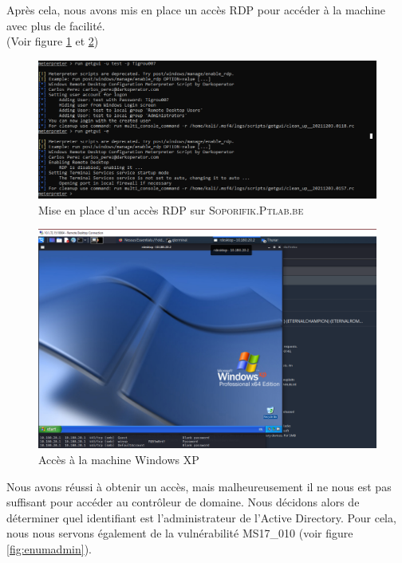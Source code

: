 \documentclass[a4paper]{article}
\begin{document}
Après cela, nous avons mis en place un accès RDP pour accéder à la machine avec plus de facilité.\\ (Voir figure \ref{fig:getgui} et \ref{fig:winxp})

\begin{figure}[H]
    \centering
    \includegraphics[width=1\textwidth]{images/lab4/rdp.PNG}
    \caption{Mise en place d'un accès RDP sur \textsc{Soporifik.Ptlab.be}}
    \label{fig:getgui}
\end{figure}

\begin{figure}[H]
    \centering
    \includegraphics[width=1\textwidth]{images/lab4/winxp_access.png}
    \caption{Accès à la machine Windows XP}
    \label{fig:winxp}
\end{figure}

Nous avons réussi à obtenir un accès, mais malheureusement il ne nous est pas suffisant pour accéder au contrôleur de domaine. Nous décidons alors de déterminer quel identifiant est l'administrateur de l'Active Directory. Pour cela, nous nous servons également de la vulnérabilité MS17\_010 (voir figure \ref{fig:enumadmin}).
\end{document}
